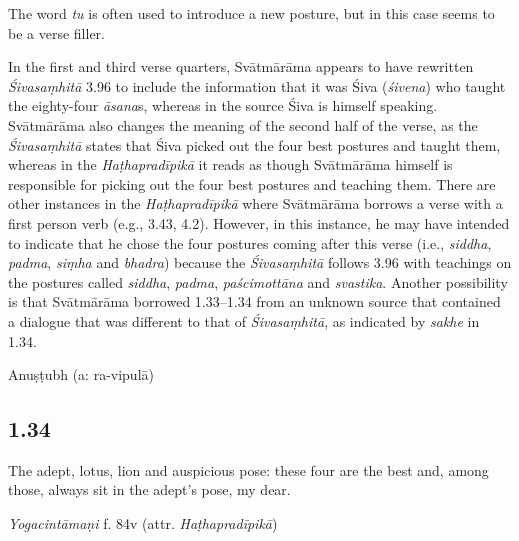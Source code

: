 \begin{ekdosis}
\begin{testimonia}[hp01_033]
\end{testimonia}

\begin{philcomm}[hp01_033]
The word \emph{tu} is often used to introduce a new posture, but in this case seems to be a verse filler.

 
In the first and third verse quarters, Svātmārāma appears to have rewritten \emph{Śivasaṃhitā} 3.96 to include the information that it was Śiva (\emph{śivena}) who taught the eighty-four \emph{āsana}s, whereas in the source Śiva is himself speaking. Svātmārāma also changes the meaning of the second half of the verse, as the \emph{Śivasaṃhitā} states that Śiva picked out the four best postures and taught them, whereas in the \emph{Haṭhapradīpikā} it reads as though Svātmārāma himself is responsible for picking out the four best postures and teaching them. There are other instances in the \emph{Haṭhapradīpikā} where Svātmārāma borrows a verse with a first person verb (e.g., 3.43, 4.2). However, in this instance, he may have intended to indicate that he chose the four postures coming after this verse (i.e., \emph{siddha}, \emph{padma}, \emph{siṃha} and \emph{bhadra}) because the \emph{Śivasaṃhitā} follows 3.96 with teachings on the postures called \emph{siddha}, \emph{padma}, \emph{paścimottāna} and \emph{svastika}. Another possibility is that Svātmārāma borrowed 1.33–1.34 from an unknown source that contained a dialogue that was different to that of \emph{Śivasaṃhitā}, as indicated by \emph{sakhe} in 1.34.
\end{philcomm}

\begin{metre}[hp01_033]
Anuṣṭubh (a: ra-vipulā)
\end{metre}

\subsection*{1.34}
\begin{translation}[hp01_034]
The adept, lotus, lion and auspicious pose: these four are the best and, among those, always sit in the adept’s pose, my dear.
\end{translation}


\begin{testimonia}[hp01_034]
\emph{Yogacintāmaṇi} f. 84v (attr. \emph{Haṭhapradīpikā})


\end{testimonia}
\end{ekdosis}
